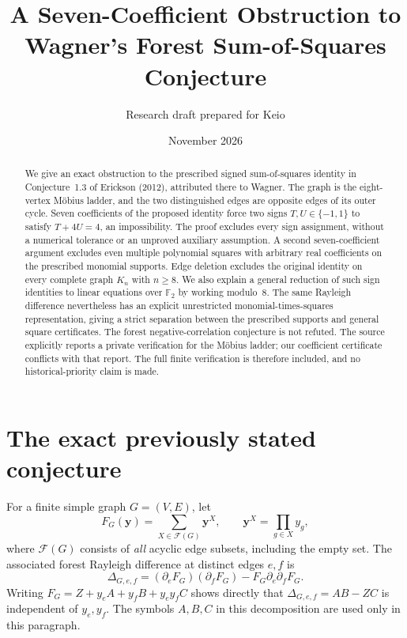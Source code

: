\documentclass[11pt,a4paper]{article}
\title{A Seven-Coefficient Obstruction to Wagner's\newline
Forest Sum-of-Squares Conjecture}
\author{Research draft prepared for Keio}
\date{November 2026}
\newcommand{\FF}{\mathcal F}
\newcommand{\Ftwo}{\mathbb F_2}
\begin{document}
\maketitle
\begin{abstract}
We give an exact obstruction to the prescribed signed sum-of-squares
identity in Conjecture~1.3 of Erickson (2012), attributed there to
Wagner. The graph is the eight-vertex M\"obius ladder, and the two
distinguished edges are opposite edges of its outer cycle. Seven
coefficients of the proposed identity force two signs $T,U\in\{-1,1\}$
to satisfy $T+4U=4$, an impossibility. The proof excludes every sign
assignment, without a numerical tolerance or an unproved auxiliary
assumption. A second seven-coefficient argument excludes even multiple
polynomial squares with arbitrary real coefficients on the prescribed
monomial supports. Edge deletion excludes the original identity on every
complete graph $K_n$ with $n\ge8$. We also explain a general reduction
of such sign identities to linear equations over $\Ftwo$ by working
modulo~$8$. The same Rayleigh difference nevertheless has an explicit
unrestricted monomial-times-squares representation, giving a strict
separation between the prescribed supports and general square certificates.
The forest negative-correlation conjecture is not refuted. The source explicitly
reports a private verification for the M\"obius ladder; our coefficient
certificate conflicts with that report. The full finite verification
is therefore included, and no historical-priority claim is made.
\end{abstract}

\section{The exact previously stated conjecture}

For a finite simple graph $G=(V,E)$, let
\[
 F_G(\boldsymbol y)=\sum_{X\in\FF(G)}\boldsymbol y^X,
 \qquad \boldsymbol y^X=\prod_{g\in X}y_g,
\]
where $\FF(G)$ consists of \emph{all} acyclic edge subsets, including
the empty set. The associated forest Rayleigh difference at distinct
edges $e,f$ is
\begin{equation}\label{eq:rayleigh}
 \Delta_{G,e,f}=(\partial_eF_G)(\partial_fF_G)
                  -F_G\partial_e\partial_fF_G.
\end{equation}
Writing $F_G=Z+y_eA+y_fB+y_ey_fC$ shows directly that
$\Delta_{G,e,f}=AB-ZC$ is independent of $y_e,y_f$.
The symbols $A,B,C$ in this decomposition are used only in this paragraph.
\end{document}
